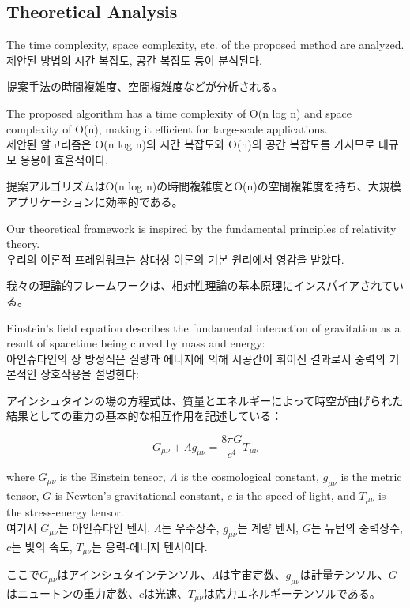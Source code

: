 \documentclass[preprint,12pt]{elsarticle}
\begin{document}
\subsection{Theoretical Analysis}
The time complexity, space complexity, etc. of the proposed method are analyzed. \\
제안된 방법의 시간 복잡도, 공간 복잡도 등이 분석된다. \\
\begin{CJK}{UTF8}{min}
提案手法の時間複雑度、空間複雑度などが分析される。
\end{CJK}

The proposed algorithm has a time complexity of O(n log n) and space complexity of O(n), making it efficient for large-scale applications. \\
제안된 알고리즘은 O(n log n)의 시간 복잡도와 O(n)의 공간 복잡도를 가지므로 대규모 응용에 효율적이다. \\
\begin{CJK}{UTF8}{min}
提案アルゴリズムはO(n log n)の時間複雑度とO(n)の空間複雑度を持ち、大規模アプリケーションに効率的である。
\end{CJK}

Our theoretical framework is inspired by the fundamental principles of relativity theory. \\
우리의 이론적 프레임워크는 상대성 이론의 기본 원리에서 영감을 받았다. \\
\begin{CJK}{UTF8}{min}
我々の理論的フレームワークは、相対性理論の基本原理にインスパイアされている。
\end{CJK}

Einstein's field equation describes the fundamental interaction of gravitation as a result of spacetime being curved by mass and energy: \\
아인슈타인의 장 방정식은 질량과 에너지에 의해 시공간이 휘어진 결과로서 중력의 기본적인 상호작용을 설명한다: \\
\begin{CJK}{UTF8}{min}
アインシュタインの場の方程式は、質量とエネルギーによって時空が曲げられた結果としての重力の基本的な相互作用を記述している：
\end{CJK}

\begin{equation}
G_{\mu\nu} + \Lambda g_{\mu\nu} = \frac{8\pi G}{c^4} T_{\mu\nu}
\end{equation}

where $G_{\mu\nu}$ is the Einstein tensor, $\Lambda$ is the cosmological constant, $g_{\mu\nu}$ is the metric tensor, $G$ is Newton's gravitational constant, $c$ is the speed of light, and $T_{\mu\nu}$ is the stress-energy tensor. \\
여기서 $G_{\mu\nu}$는 아인슈타인 텐서, $\Lambda$는 우주상수, $g_{\mu\nu}$는 계량 텐서, $G$는 뉴턴의 중력상수, $c$는 빛의 속도, $T_{\mu\nu}$는 응력-에너지 텐서이다. \\
\begin{CJK}{UTF8}{min}
ここで$G_{\mu\nu}$はアインシュタインテンソル、$\Lambda$は宇宙定数、$g_{\mu\nu}$は計量テンソル、$G$はニュートンの重力定数、$c$は光速、$T_{\mu\nu}$は応力エネルギーテンソルである。
\end{CJK}
\end{document}
